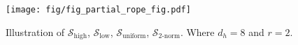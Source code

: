 \begin{figure}[t]
  \centering
  \texttt{[image: fig/fig\_partial\_rope\_fig.pdf]}
  \caption{Illustration of $\mathcal{S}_{\text{high}}$, $\mathcal{S}_{\text{low}}$, $\mathcal{S}_{\text{uniform}}$, $\mathcal{S}_{\text{2-norm}}$. Where $d_h=8$ and $r=2$.}
  \vspace{-0.2cm}
  \label{fig:partial_rope}
\end{figure}
